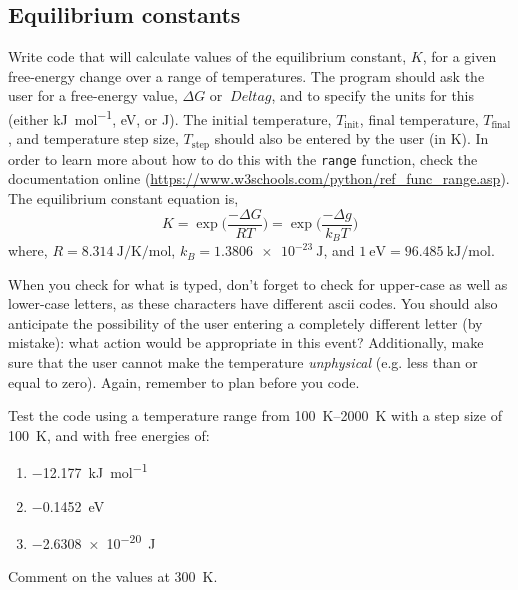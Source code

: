 \documentclass[a4paper]{article}
\begin{document}
\subsection{Equilibrium constants}

Write code that will calculate values of the equilibrium constant, $K$, for a given free-energy change over a range of temperatures. 
The program should ask the user for a free-energy value, $\Delta G$ or $\	Delta g$, and to specify the units for this (either \si{\kilo\joule\per\mol}, \si{\eV}, or \si{\joule}). 
The initial temperature, $T_{\text{init}}$, final temperature, $T_{\text{final}}$, and temperature step size, $T_{\text{step}}$ should also be entered by the user (in \si{\kelvin}). 
In order to learn more about how to do this with the \texttt{range} function, check the documentation online (\url{https://www.w3schools.com/python/ref_func_range.asp}).
The equilibrium constant equation is, 
\begin{equation} 
	K = \exp{\bigg(\frac{-\Delta G}{RT}\bigg)} = \exp{\bigg(\frac{-\Delta g}{k_BT}\bigg)}
\end{equation}
where, $R = \SI{8.314}{\joule\per\kelvin\per\mol}$, $k_B = \SI{1.3806e-23}{\joule}$, and $\SI{1}{\eV} = \SI{96.485}{\kilo\joule\per\mol}$. 

When you check for what is typed, don’t forget to check for upper-case as well as lower-case letters, as these characters have different ascii codes.
You should also anticipate the possibility of the user entering a completely different letter (by mistake): what action would be appropriate in this event?
Additionally, make sure that the user cannot make the temperature \emph{unphysical} (e.g. less than or equal to zero). 
Again, remember to plan before you code. 

Test the code using a temperature range from \SIrange{100}{2000}{\kelvin} with a step size of \SI{100}{\kelvin}, and with free energies of:
\begin{enumerate}
	\item{\SI{-12.177}{\kilo\joule\per\mol}}
	\item{\SI{-0.1452}{\eV}}
	\item{\SI{-2.6308e-20}{\joule}}
\end{enumerate}
Comment on the values at \SI{300}{\kelvin}.

%
%
\end{document}
